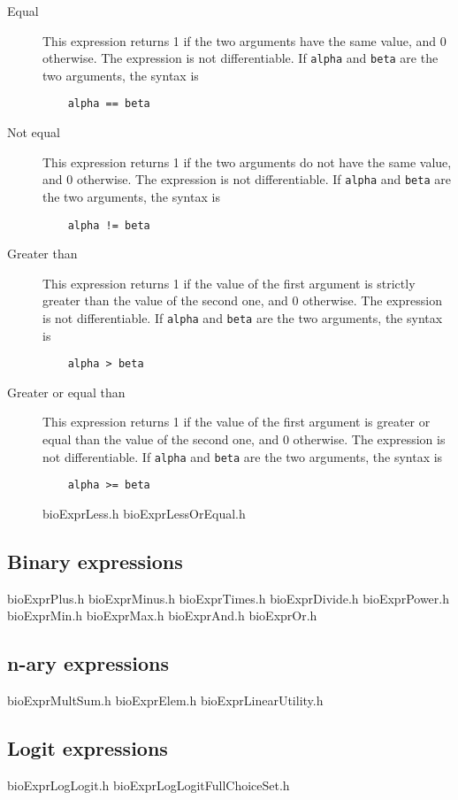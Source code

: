 \documentclass[12pt,a4paper]{article}
\begin{document}
\begin{description}
\item[Equal] This expression returns 1 if the two arguments have the same value, and 0 otherwise.
  The expression is not differentiable. If \lstinline+alpha+ and \lstinline+beta+ are the two arguments,  the syntax is
  \begin{lstlisting}
    alpha == beta
  \end{lstlisting}

\item[Not equal] This expression returns 1 if the two arguments do not have the same value, and 0 otherwise.
  The expression is not differentiable. If \lstinline+alpha+ and \lstinline+beta+ are the two arguments,  the syntax is
  \begin{lstlisting}
    alpha != beta
  \end{lstlisting}

\item[Greater than] This expression returns 1 if the value of the first argument is strictly greater than the value of the second one, and 0 otherwise.
  The expression is not differentiable. If \lstinline+alpha+ and \lstinline+beta+ are the two arguments,  the syntax is
  \begin{lstlisting}
    alpha > beta
  \end{lstlisting}

\item[Greater or equal than] This expression returns 1 if the value of the first argument is greater or equal than the value of the second one, and 0 otherwise.
  The expression is not differentiable. If \lstinline+alpha+ and \lstinline+beta+ are the two arguments,  the syntax is
  \begin{lstlisting}
    alpha >= beta
  \end{lstlisting}
  
bioExprLess.h
bioExprLessOrEqual.h
\end{description}
\subsection{Binary expressions}
bioExprPlus.h
bioExprMinus.h
bioExprTimes.h
bioExprDivide.h
bioExprPower.h
bioExprMin.h
bioExprMax.h
bioExprAnd.h
bioExprOr.h
\subsection{n-ary expressions}
bioExprMultSum.h
bioExprElem.h
bioExprLinearUtility.h
\subsection{Logit expressions}
bioExprLogLogit.h
bioExprLogLogitFullChoiceSet.h











\end{document}
